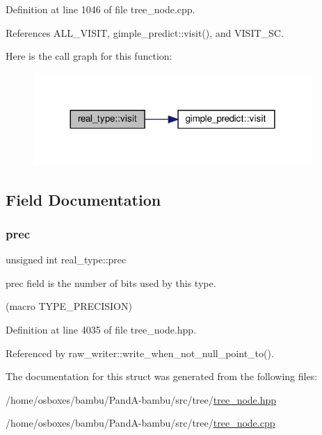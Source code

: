 Definition at line 1046 of file tree\+\_\+node.\+cpp.



References A\+L\+L\+\_\+\+V\+I\+S\+IT, gimple\+\_\+predict\+::visit(), and V\+I\+S\+I\+T\+\_\+\+SC.

Here is the call graph for this function\+:
\nopagebreak
\begin{figure}[H]
\begin{center}
\leavevmode
\includegraphics[width=300pt]{d8/d00/structreal__type_a9f45291aa61c33e2abba3618ce224dc3_cgraph}
\end{center}
\end{figure}


\subsection{Field Documentation}
\mbox{\label{structreal__type_a3348202ef122e105a26211dc500431f8}} 
\subsubsection{\texorpdfstring{prec}{prec}}
{\footnotesize\ttfamily unsigned int real\+\_\+type\+::prec}



prec field is the number of bits used by this type. 

(macro T\+Y\+P\+E\+\_\+\+P\+R\+E\+C\+I\+S\+I\+ON) 

Definition at line 4035 of file tree\+\_\+node.\+hpp.



Referenced by raw\+\_\+writer\+::write\+\_\+when\+\_\+not\+\_\+null\+\_\+point\+\_\+to().



The documentation for this struct was generated from the following files\+:\begin{DoxyCompactItemize}
\item 
/home/osboxes/bambu/\+Pand\+A-\/bambu/src/tree/\hyperlink{tree__node_8hpp}{tree\+\_\+node.\+hpp}\item 
/home/osboxes/bambu/\+Pand\+A-\/bambu/src/tree/\hyperlink{tree__node_8cpp}{tree\+\_\+node.\+cpp}\end{DoxyCompactItemize}
